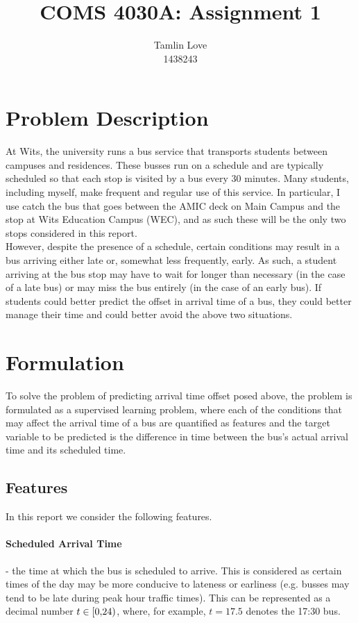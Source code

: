 \documentclass[12pt]{extarticle}
\title{COMS 4030A: Assignment 1}
\author{Tamlin Love\\1438243}
\begin{document}
\maketitle

\section{Problem Description}
At Wits, the university runs a bus service that transports students between campuses and residences. These busses run on a schedule and are typically scheduled so that each stop is visited by a bus every 30 minutes. Many students, including myself, make frequent and regular use of this service. In particular, I use catch the bus that goes between the AMIC deck on Main Campus and the stop at Wits Education Campus (WEC), and as such these will be the only two stops considered in this report.
\\
However, despite the presence of a schedule, certain conditions may result in a bus arriving either late or, somewhat less frequently, early. As such, a student arriving at the bus stop may have to wait for longer than necessary (in the case of a late bus) or may miss the bus entirely (in the case of an early bus). If students could better predict the offset in arrival time of a bus, they could better manage their time and could better avoid the above two situations.
\section{Formulation}
To solve the problem of predicting arrival time offset posed above, the problem is formulated as a supervised learning problem, where each of the conditions that may affect the arrival time of a bus are quantified as features and the target variable to be predicted is the difference in time between the bus's actual arrival time and its scheduled time.
\subsection{Features}
In this report we consider the following features.
\paragraph{Scheduled Arrival Time} - the time at which the bus is scheduled to arrive. This is considered as certain times of the day may be more conducive to lateness or earliness (e.g. busses may tend to be late during peak hour traffic times). This can be represented as a decimal number $t \in \interval[{0,24})$, where, for example, $t = 17.5$ denotes the 17:30 bus.
\end{document}

